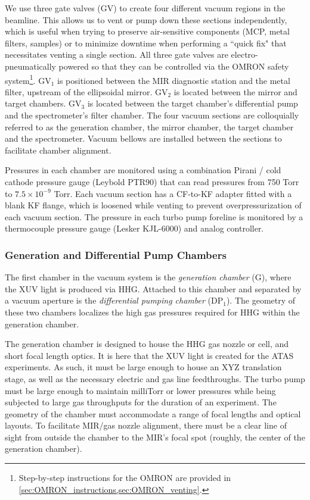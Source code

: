 We use three gate valves (GV) to create four different vacuum regions in the beamline. This allows us to vent or pump down these sections independently, which is useful when trying to preserve air-sensitive components (MCP, metal filters, samples) or to minimize downtime when performing a ``quick fix" that necessitates venting a single section. All three gate valves are electro-pneumatically powered so that they can be controlled via the OMRON safety system\footnote{Step-by-step instructions for the OMRON are provided in \cref{sec:OMRON_instructions,sec:OMRON_venting}.}. GV$_1$ is positioned between the MIR diagnostic station and the metal filter, upstream of the ellipsoidal mirror. GV$_2$ is located between the mirror and target chambers. GV$_3$ is located between the target chamber's differential pump and the spectrometer's filter chamber. The four vacuum sections are colloquially referred to as the generation chamber, the mirror chamber, the target chamber and the spectrometer. Vacuum bellows are installed between the sections to facilitate chamber alignment.

Pressures in each chamber are monitored using a combination Pirani / cold cathode pressure gauge (Leybold PTR90) that can read pressures from 750 Torr to $7.5 \times 10^{-9}$ Torr. Each vacuum section has a CF-to-KF adapter fitted with a blank KF flange, which is loosened while venting to prevent overpressurization of each vacuum section. The pressure in each turbo pump foreline is monitored by a thermocouple pressure gauge (Lesker KJL-6000) and analog controller.

\subsubsection{Generation and Differential Pump Chambers}

The first chamber in the vacuum system is the \textit{generation chamber} (G), where the XUV light is produced via HHG. Attached to this chamber and separated by a vacuum aperture is the \textit{differential pumping chamber} (DP$_1$). The geometry of these two chambers localizes the high gas pressures required for HHG within the generation chamber.

The generation chamber is designed to house the HHG gas nozzle or cell, and short focal length optics. It is here that the XUV light is created for the ATAS experiments. As such, it must be large enough to house an XYZ translation stage, as well as the necessary electric and gas line feedthroughs. The turbo pump must be large enough to maintain milliTorr or lower pressures while being subjected to large gas throughputs for the duration of an experiment. The geometry of the chamber must accommodate a range of focal lengths and optical layouts. To facilitate MIR/gas nozzle alignment, there must be a clear line of sight from outside the chamber to the MIR's focal spot (roughly, the center of the generation chamber).

